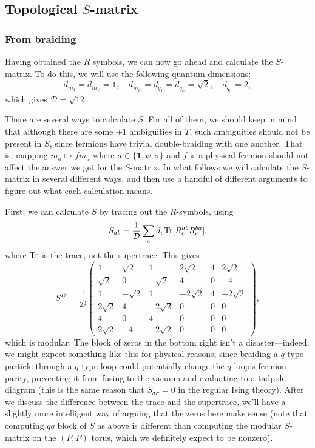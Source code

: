 \documentclass[12pt,a4paper]{article}
\newcommand{\unit}{\mathbf{1}}
\newcommand{\mcd}{\mathcal{D}}
\newcommand\be            {\begin{equation}}
\newcommand\ee            {\end{equation}}
\begin{document}
\subsection{Topological $S$-matrix}
\subsubsection{From braiding}

Having obtained the $R$ symbols, we can now go ahead and calculate the $S$-matrix. To do this, we will use the following quantum dimensions: 
\be d_{m_1} = d_{m_\psi} = 1,\quad d_{m_\sigma^+} = d_{q_1} = d_{q_\psi} = \sqrt{2},\quad d_{q_\sigma} = 2,\ee
which gives $\mcd = \sqrt{12}$.

There are several ways to calculate $S$. For all of them, we should keep in mind that although there are some $\pm1$ ambiguities in $T$, such ambiguities should not be present in $S$, since fermions have trivial double-braiding with one another. That is, mapping $m_a \mapsto fm_a$ where $a\in \{\unit,\psi,\sigma\}$ and $f$ is a physical fermion should not affect the answer we get for the $S$-matrix. In what follows we will calculate the $S$-matrix in several different ways, and then use a handful of different arguments to figure out what each calculation means. 

First, we can calculate $S$ by tracing out the $R$-symbols, using 
\be S_{ab} = \frac{1}{\mcd}\sum_{c}d_c{\rm Tr}[R^{ab}_cR^{ba}_c],\ee
where ${\rm Tr}$ is the trace, not the supertrace. This gives 
\be 
 S^{Tr} = \frac{1}{\mcd} \begin{pmatrix} 
1&\sqrt{2}&1&2\sqrt{2}&4&2\sqrt{2} \\
 \sqrt{2}&0&-\sqrt{2}&4&0&-4 \\ 
 1&-\sqrt{2}&1&-2\sqrt{2}&4&-2\sqrt{2} \\ 
 2\sqrt{2}&4& -2\sqrt{2}&0&0&0 \\ 
 4&0&4&0&0&0 \\ 
  2\sqrt{2}&-4&- 2\sqrt{2}&0 & 0 & 0 \end{pmatrix}, \ee
 which is modular. The block of zeros in the bottom right isn't a disaster---indeed, we might expect something like this for physical reasons, since braiding a $q$-type particle through a $q$-type loop could potentially change the $q$-loop's fermion parity, preventing it from fusing to the vacuum and evaluating to a tadpole diagram (this is the same reason that $S_{\sigma\sigma} = 0$ in the regular Ising theory). After we discuss the difference between the trace and the supertrace, we'll have a slightly more intelligent way of arguing that the zeros here make sense (note that computing $qq$ block of $S$ as above is different than computing the modular $S$-matrix on the $(P,P)$ torus, which we definitely expect to be nonzero). 
 
\end{document}
